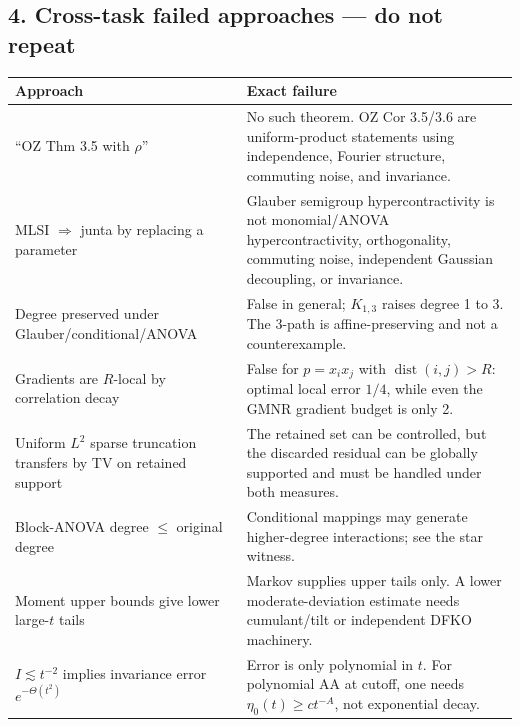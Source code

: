 \subsection{4. Cross-task failed approaches --- do not repeat}\label{cross-task-failed-approaches-do-not-repeat}

{\def\LTcaptype{none} %
\begin{longtable}[]{@{}
  >{\raggedright\arraybackslash}p{}
  >{\raggedright\arraybackslash}p{}@{}}
\toprule\noalign{}
\begin{minipage}[b]{\linewidth}\raggedright
Approach
\end{minipage} & \begin{minipage}[b]{\linewidth}\raggedright
Exact failure
\end{minipage} \\
\midrule\noalign{}
\endhead
\bottomrule\noalign{}
\endlastfoot
``OZ Thm 3.5 with \(\rho\)'' & No such theorem. OZ Cor 3.5/3.6 are uniform-product statements using independence, Fourier structure, commuting noise, and invariance. \\
MLSI \(\Rightarrow\) junta by replacing a parameter & Glauber semigroup hypercontractivity is not monomial/ANOVA hypercontractivity, orthogonality, commuting noise, independent Gaussian decoupling, or invariance. \\
Degree preserved under Glauber/conditional/ANOVA & False in general; \(K_{1,3}\) raises degree 1 to 3. The 3-path is affine-preserving and not a counterexample. \\
Gradients are \(R\)-local by correlation decay & False for \(p=x_ix_j\) with \(\operatorname{dist}(i,j)>R\): optimal local error \(1/4\), while even the GMNR gradient budget is only 2. \\
Uniform \(L^2\) sparse truncation transfers by TV on retained support & The retained set can be controlled, but the discarded residual can be globally supported and must be handled under both measures. \\
Block-ANOVA degree \(\le\) original degree & Conditional mappings may generate higher-degree interactions; see the star witness. \\
Moment upper bounds give lower large-\(t\) tails & Markov supplies upper tails only. A lower moderate-deviation estimate needs cumulant/tilt or independent DFKO machinery. \\
\(I\lesssim t^{-2}\) implies invariance error \(e^{-\Theta(t^2)}\) & Error is only polynomial in \(t\). For polynomial AA at cutoff, one needs \(\eta_0(t)\ge ct^{-A}\), not exponential decay. \\

\end{longtable}}
